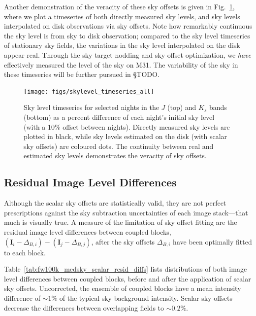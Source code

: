 \documentclass[iop]{emulateapj}
\newcommand{\vect}[1]{\boldsymbol{#1}} %
\newcommand{\todo}[1]{\textcolor{BurntOrange}{\textsf{#1}}} %
\newcommand{\Fig}[1]{Fig.~\ref{fig:#1}}  %
\newcommand{\Tab}[1]{Table~\ref{tab:#1}}  %
\begin{document}
Another demonstration of the veracity of these sky offsets is given in \Fig{skylevel_timeseries}, where we plot a timeseries of both directly measured sky levels, and sky levels interpolated on disk observations via sky offsets.
Note how remarkably continuous the sky level is from sky to disk observation; compared to the sky level timeseries of stationary sky fields, the variations in the sky level interpolated on the disk appear real.
Through the sky target nodding and sky offset optimization, we \emph{have} effectively measured the level of the sky on M31.
The variability of the sky in these timeseries will be further pursued in \S \todo{TODO}.

\begin{figure}[t]
\centering
\texttt{[image: figs/skylevel\_timeseries\_all]}
\caption{Sky level timeseries for selected nights in the $J$ (top) and $K_s$ bands (bottom) as a percent difference of each night's initial sky level (with a 10\% offset between nights). Directly measured sky levels are plotted in black, while sky levels estimated on the disk (with scalar sky offsets) are coloured dots. The continuity between real and estimated sky levels demonstrates the veracity of sky offsets.}
\label{fig:skylevel_timeseries}
\end{figure}

\subsection{Residual Image Level Differences}
\label{sec:residual_diffs}

Although the scalar sky offsets are statistically valid, they are not perfect prescriptions against the sky subtraction uncertainties of each image stack---that much is visually true.
A measure of the limitation of sky offset fitting are the residual image level differences between coupled blocks, $(\vect{I}_i - \Delta_{B,i}) - (\vect{I}_j - \Delta_{B,j})$, after the sky offsets $\Delta_{B,i}$ have been optimally fitted to each block.

\Tab{fw100k_medsky_scalar_resid_diffs} lists distributions of both image level differences between coupled blocks, before and after the application of scalar sky offsets.
Uncorrected, the ensemble of coupled blocks have a mean intensity difference of $\sim 1\%$ of the typical sky background intensity.
Scalar sky offsets decrease the differences between overlapping fields to $\sim 0.2\%$.
\end{document}
